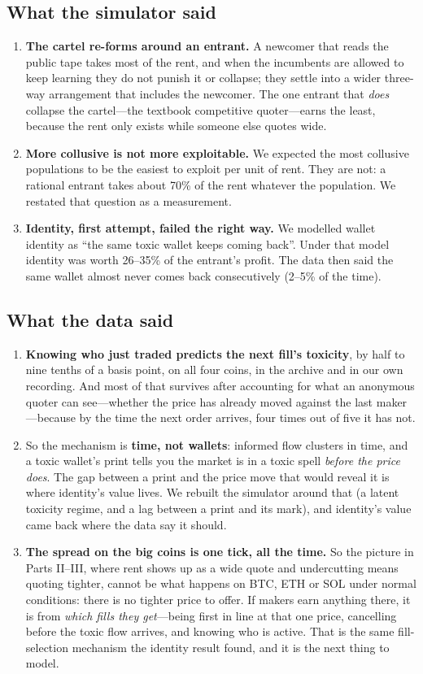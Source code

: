\documentclass[11pt]{article}
\begin{document}
\subsection{What the simulator said}
\begin{enumerate}
\item \textbf{The cartel re-forms around an entrant.} A newcomer that reads the public tape takes most
of the rent, and when the incumbents are allowed to keep learning they do not punish it or collapse;
they settle into a wider three-way arrangement that includes the newcomer. The one entrant that
\emph{does} collapse the cartel---the textbook competitive quoter---earns the least, because the rent
only exists while someone else quotes wide.
\item \textbf{More collusive is not more exploitable.} We expected the most collusive populations to be
the easiest to exploit per unit of rent. They are not: a rational entrant takes about 70\% of the rent
whatever the population. We restated that question as a measurement.
\item \textbf{Identity, first attempt, failed the right way.} We modelled wallet identity as ``the same
toxic wallet keeps coming back''. Under that model identity was worth 26--35\% of the entrant's profit.
The data then said the same wallet almost never comes back consecutively (2--5\% of the time).
\end{enumerate}

\subsection{What the data said}
\begin{enumerate}
\item \textbf{Knowing who just traded predicts the next fill's toxicity}, by half to nine tenths of a
basis point, on all four coins, in the archive and in our own recording. And most of that survives
after accounting for what an anonymous quoter can see---whether the price has already moved against the
last maker---because by the time the next order arrives, four times out of five it has not.
\item So the mechanism is \textbf{time, not wallets}: informed flow clusters in time, and a toxic
wallet's print tells you the market is in a toxic spell \emph{before the price does}. The gap between a
print and the price move that would reveal it is where identity's value lives. We rebuilt the
simulator around that (a latent toxicity regime, and a lag between a print and its mark), and identity's
value came back where the data say it should.
\item \textbf{The spread on the big coins is one tick, all the time.} So the picture in Parts II--III,
where rent shows up as a wide quote and undercutting means quoting tighter, cannot be what happens on
BTC, ETH or SOL under normal conditions: there is no tighter price to offer. If makers earn anything
there, it is from \emph{which fills they get}---being first in line at that one price, cancelling before
the toxic flow arrives, and knowing who is active. That is the same fill-selection mechanism the
identity result found, and it is the next thing to model.
\end{enumerate}
\end{document}
